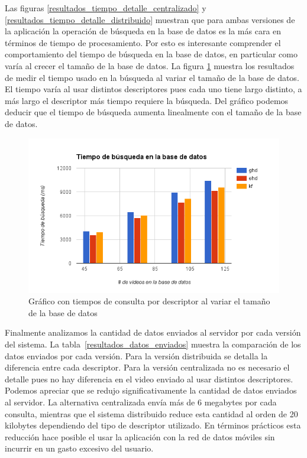 Las figuras \ref{resultados_tiempo_detalle_centralizado} y \ref{resultados_tiempo_detalle_distribuido} muestran que para ambas versiones de la aplicación la operación de búsqueda en la base de datos es la más cara en términos de tiempo de procesamiento. Por esto es interesante comprender el comportamiento del tiempo de búsqueda en la base de datos, en particular como varía al crecer el tamaño de la base de datos. La figura \ref{resultados_tiempo_dbquery} muestra los resultados de medir el tiempo usado en la búsqueda al variar el tamaño de la base de datos. El tiempo varía al usar distintos descriptores pues cada uno tiene largo distinto, a más largo el descriptor más tiempo requiere la búsqueda. Del gráfico podemos deducir que el tiempo de búsqueda aumenta linealmente con el tamaño de la base de datos. 

	\begin{figure}[!h]
		\centering
		\includegraphics[width=\textwidth]{imagenes/cap5/resultados_tiempo_dbquery.png}
		\caption{Gráfico con tiempos de consulta por descriptor al variar el tamaño de la base de datos}
		\label{resultados_tiempo_dbquery}
	\end{figure}

Finalmente analizamos la cantidad de datos enviados al servidor por cada versión del sistema. La tabla~\ref{resultados_datos_enviados} muestra la comparación de los datos enviados por cada versión. Para la versión distribuida se detalla la diferencia entre cada descriptor. Para la versión centralizada no es necesario el detalle pues no hay diferencia en el video enviado al usar distintos descriptores. Podemos apreciar que se redujo significativamente la cantidad de datos enviados al servidor. La alternativa centralizada envía más de 6 megabytes por cada consulta, mientras que el sistema distribuido reduce esta cantidad al orden de 20 kilobytes dependiendo del tipo de descriptor utilizado. En términos prácticos esta reducción hace posible el usar la aplicación con la red de datos móviles sin incurrir en un gasto excesivo del usuario.

